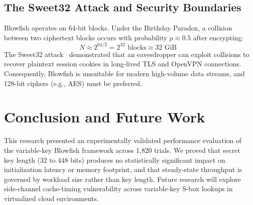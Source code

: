 \documentclass[conference]{IEEEtran}
\begin{document}
\subsection{The Sweet32 Attack and Security Boundaries}
Blowfish operates on 64-bit blocks. Under the Birthday Paradox, a collision between two ciphertext blocks occurs with probability $p \approx 0.5$ after encrypting:
\begin{equation}
N \approx 2^{64/2} = 2^{32} \text{ blocks} \approx 32 \text{ GiB}
\end{equation}
The Sweet32 attack~\cite{bhargavan2016sweet32} demonstrated that an eavesdropper can exploit collisions to recover plaintext session cookies in long-lived TLS and OpenVPN connections. Consequently, Blowfish is unsuitable for modern high-volume data streams, and 128-bit ciphers (e.g., AES) must be preferred.

\section{Conclusion and Future Work}
This research presented an experimentally validated performance evaluation of the variable-key Blowfish framework across 1,820 trials. We proved that secret key length (32 to 448 bits) produces no statistically significant impact on initialization latency or memory footprint, and that steady-state throughput is governed by workload size rather than key length. Future research will explore side-channel cache-timing vulnerability across variable-key S-box lookups in virtualized cloud environments.



\end{document}
